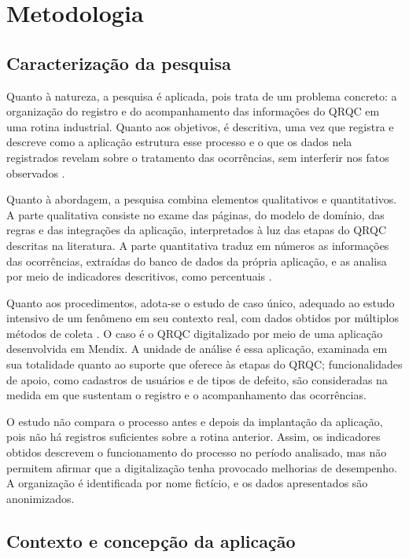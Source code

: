 \chapter{Metodologia}
\label{cap:metodologia}

\section{Caracterização da pesquisa}
\label{sec:caracterizacao}

Quanto à natureza, a pesquisa é aplicada, pois trata de um problema concreto: a organização do registro e do acompanhamento das informações do QRQC em uma rotina industrial. Quanto aos objetivos, é descritiva, uma vez que registra e descreve como a aplicação estrutura esse processo e o que os dados nela registrados revelam sobre o tratamento das ocorrências, sem interferir nos fatos observados \cite[p.~51--52]{prodanov2013}.

Quanto à abordagem, a pesquisa combina elementos qualitativos e quantitativos. A parte qualitativa consiste no exame das páginas, do modelo de domínio, das regras e das integrações da aplicação, interpretados à luz das etapas do QRQC descritas na literatura. A parte quantitativa traduz em números as informações das ocorrências, extraídas do banco de dados da própria aplicação, e as analisa por meio de indicadores descritivos, como percentuais \cite[p.~69]{prodanov2013}.

Quanto aos procedimentos, adota-se o estudo de caso único, adequado ao estudo intensivo de um fenômeno em seu contexto real, com dados obtidos por múltiplos métodos de coleta \cite[p.~93]{bhattacherjee2012}. O caso é o QRQC digitalizado por meio de uma aplicação desenvolvida em Mendix. A unidade de análise é essa aplicação, examinada em sua totalidade quanto ao suporte que oferece às etapas do QRQC; funcionalidades de apoio, como cadastros de usuários e de tipos de defeito, são consideradas na medida em que sustentam o registro e o acompanhamento das ocorrências.

O estudo não compara o processo antes e depois da implantação da aplicação, pois não há registros suficientes sobre a rotina anterior. Assim, os indicadores obtidos descrevem o funcionamento do processo no período analisado, mas não permitem afirmar que a digitalização tenha provocado melhorias de desempenho. A organização é identificada por nome fictício, e os dados apresentados são anonimizados.

\section{Contexto e concepção da aplicação}
\label{sec:contexto}

